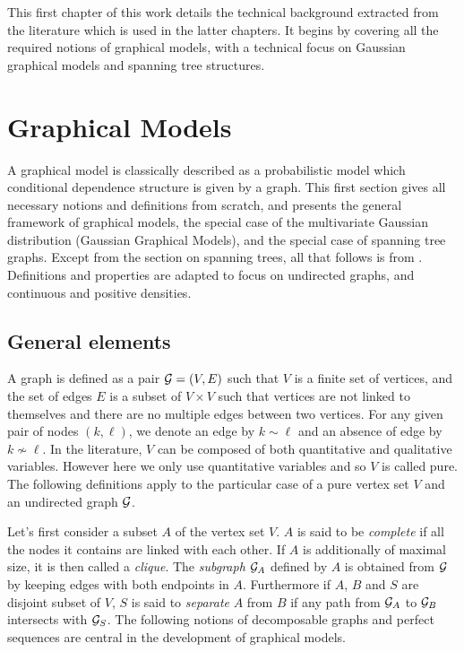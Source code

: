 
This first chapter of this work details the technical background extracted from the literature which is used in the latter chapters. It begins by covering all the required notions of graphical models, with a technical focus on Gaussian graphical models and spanning tree structures. 
 \section{Graphical Models}
 A graphical model is classically described as a probabilistic model which conditional dependence structure is given by a graph. This first section gives all necessary notions and definitions from scratch, and presents the general framework of graphical models, the special case of the multivariate Gaussian distribution (Gaussian Graphical Models), and the special case of spanning tree graphs. Except from the section on spanning trees, all that follows is from \citet{Lau96}. Definitions and properties are adapted to focus on undirected graphs, and continuous and positive densities.
 
 \subsection{General elements}
 A graph is defined as a pair $\mathcal{G}=(V,E)$ such that $V$ is a finite set of vertices, and the set of edges $E$ is a subset of $V\times V$ such that vertices are not linked to themselves and there are no multiple edges between two vertices. For any given pair of nodes $(k,\ell)$, we denote an edge by $k\sim\ell$ and an absence of edge by $k\nsim \ell$. In the literature, $V$ can be composed of both quantitative and qualitative variables. However here we  only use quantitative variables and so $V$ is called pure. The following definitions apply to the particular case of a pure vertex set $V$ and an undirected graph $\mathcal{G}$.

Let's first consider a subset $A$ of the vertex set $V$. $A$ is said to be \textit{complete} if all the nodes it contains are linked with each other. If $A$ is additionally of maximal size, it is then called a \textit{clique}. The \textit{subgraph} $\mathcal{G}_A$ defined by $A$  is obtained from $\mathcal{G}$ by keeping edges with both endpoints in $A$. Furthermore if $A$, $B$ and $S$ are disjoint subset of $V$, $S$ is said to \textit{separate} $A$ from $B$ if any path from $\mathcal{G}_A$ to $\mathcal{G}_B$ intersects with $\mathcal{G}_S$. The following notions of decomposable graphs and perfect sequences are central in the development of graphical models.
 
